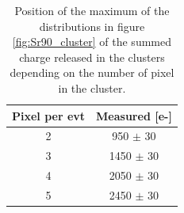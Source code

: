         \begin{table}
            \begin{center}
            \begin{tabular}{| c | c |}
            \hline
            Pixel per evt &  Measured [e-]   \\
            \hline
            \hline
            2  & 950 $\pm$ 30\\
            3  & 1450 $\pm$ 30\\ 
            4  & 2050 $\pm$ 30\\
            5  & 2450 $\pm$ 30\\ 
            \hline
            \end{tabular}
            \caption{Position of the maximum of the distributions in figure \ref{fig:Sr90_cluster} of the summed charge released in the clusters depending on the number of pixel in the cluster. }
            \label{tab:charge_cluster}
            \end{center}
        \end{table}  

